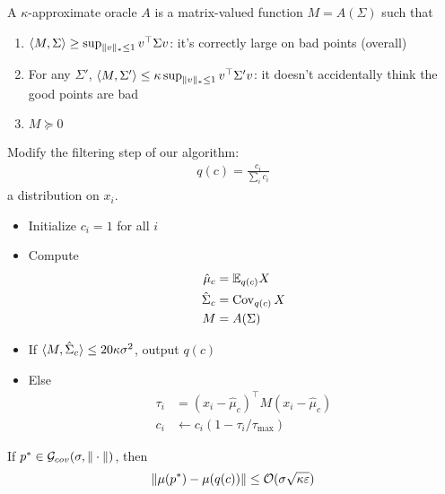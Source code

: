\begin{definition}
  A $\kappa$-approximate oracle $A$
  is a matrix-valued function $M = A(\Sigma)$ such that
  \begin{enumerate}
    \item $\braket{M, \Sigma} \geq \sup_{\|v\|_* \leq 1} v^\top \Sigma v$:
      it's correctly large on bad points (overall)
    \item For any $\Sigma'$, $\braket{M, \Sigma'} \leq \kappa \sup_{\|v\|_* \leq 1} v^\top \Sigma' v$:
      it doesn't accidentally think the good points are bad
    \item $M \succeq 0$
  \end{enumerate}
\end{definition}

Modify the filtering step of our algorithm:
\begin{align}
  q(c) = \frac{c_i}{\sum_i c_i}
\end{align}
a distribution on $x_i$.

\begin{itemize}
  \item Initialize $c_i = 1$ for all $i$
  \item Compute \begin{align}
      \hat\mu_c &= \mathbb{E}_{q(c)} X \\
      \hat\Sigma_c &= \operatorname{Cov}_{q(c)} X \\
      M &= A(\Sigma)
  \end{align}
  \item If $\braket{M, \hat\Sigma_c} \leq 20 \kappa \sigma^2$, output $q(c)$
  \item Else
    \begin{align}
      \tau_i &= (x_i - \hat\mu_c)^\top M (x_i - \hat\mu_c) \\
      c_i &\leftarrow c_i(1 - \tau_i / \tau_{\max})
    \end{align}
\end{itemize}

\begin{proposition}
  If $p^* \in \mathcal{G}_{cov}(\sigma, \|\cdot\|)$, then
  \begin{align}
    \|\mu(p^*) - \mu(q(c))\| \leq \mathcal{O}(\sigma \sqrt{\kappa \varepsilon})
  \end{align}
\end{proposition}

